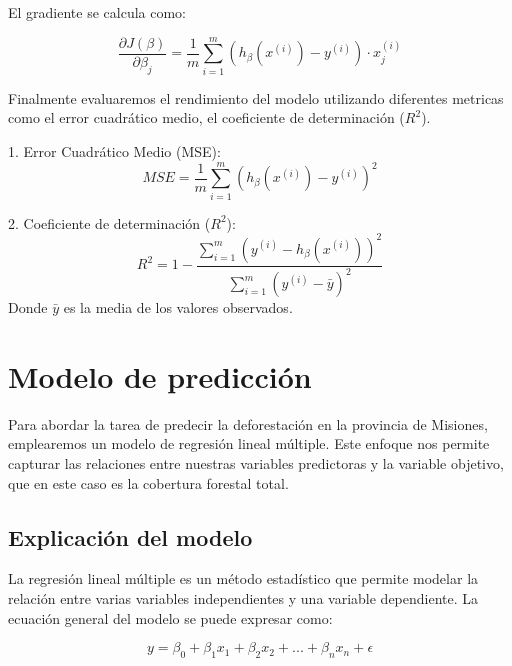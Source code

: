 \documentclass[11pt]{article}
\begin{document}
El gradiente se calcula como:

\begin{equation}
\frac{\partial J(\beta)}{\partial \beta_j} = \frac{1}{m} \sum\limits_{i = 1}^{m} (h_\beta(x^{(i)}) - y^{(i)}) \cdot x_j^{(i)}
\end{equation}



Finalmente evaluaremos el  rendimiento del modelo utilizando diferentes metricas como el error cuadrático medio, el coeficiente de determinación ($R^2$).

1. Error Cuadrático Medio (MSE):
\begin{equation}
MSE = \frac{1}{m} \sum\limits_{i = 1}^{m} (h_\beta(x^{(i)}) - y^{(i)})^2
\end{equation}

2. Coeficiente de determinación ($R^2$):
\begin{equation}
R^2 = 1 - \frac{\sum\limits_{i = 1}^{m} (y^{(i)} - h_\beta(x^{(i)}))^2}{\sum\limits_{i = 1}^{m} (y^{(i)} - \bar{y})^2}
\end{equation}
Donde $\bar{y}$ es la media de los valores observados.

\section{Modelo de predicción}

Para abordar la tarea de predecir la deforestación en la provincia de Misiones, emplearemos un modelo de regresión lineal múltiple. Este enfoque nos permite capturar las relaciones entre nuestras variables predictoras y la variable objetivo, que en este caso es la cobertura forestal total.

\subsection{Explicación del modelo}

La regresión lineal múltiple es un método estadístico que permite modelar la relación entre varias variables independientes y una variable dependiente. La ecuación general del modelo se puede expresar como:

\begin{equation}
y = \beta_0 + \beta_1x_1 + \beta_2x_2 + ... + \beta_nx_n + \epsilon
\end{equation}
\end{document}
